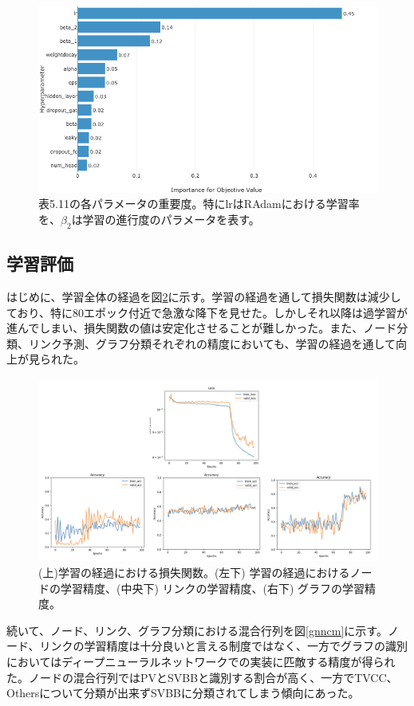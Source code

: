 \begin{figure}[H]
	\begin{center}
 \includegraphics[keepaspectratio, scale=0.3]
 	{Figure/Flavortagging/bayesian3.png}
     		\caption[各パラメータの重要度]{表5.11の各パラメータの重要度。特にlrはRAdamにおける学習率を、$\beta_2$は学習の進行度のパラメータを表す。}
 		\label{bayes3}
	\end{center}
\end{figure}

\subsection{学習評価}
はじめに、学習全体の経過を図\ref{gnnoutput}に示す。学習の経過を通して損失関数は減少しており、特に80エポック付近で急激な降下を見せた。しかしそれ以降は過学習が進んでしまい、損失関数の値は安定化させることが難しかった。また、ノード分類、リンク予測、グラフ分類それぞれの精度においても、学習の経過を通して向上が見られた。

\begin{figure}[H]
	\begin{center}
 \includegraphics[keepaspectratio, scale=0.3]
 	{Figure/Flavortagging/gnnoutput.png}
 		\caption[学習経過における損失と精度]{(上)学習の経過における損失関数。(左下) 学習の経過におけるノードの学習精度、(中央下) リンクの学習精度、(右下) グラフの学習精度。}
 		\label{gnnoutput}
	\end{center}
\end{figure}
続いて、ノード、リンク、グラフ分類における混合行列を図\ref{gnncm}に示す。ノード、リンクの学習精度は十分良いと言える制度ではなく、一方でグラフの識別においてはディープニューラルネットワークでの実装に匹敵する精度が得られた。ノードの混合行列ではPVとSVBBと識別する割合が高く、一方でTVCC、Othersについて分類が出来ずSVBBに分類されてしまう傾向にあった。

